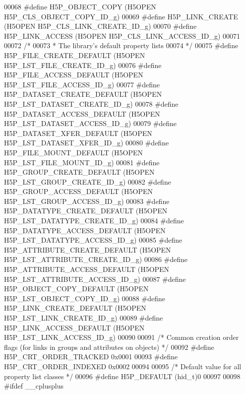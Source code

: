 \begin{DoxyCode}
00068 \textcolor{preprocessor}{#define H5P\_OBJECT\_COPY         (H5OPEN H5P\_CLS\_OBJECT\_COPY\_ID\_g)}
00069 \textcolor{preprocessor}{#define H5P\_LINK\_CREATE         (H5OPEN H5P\_CLS\_LINK\_CREATE\_ID\_g)}
00070 \textcolor{preprocessor}{#define H5P\_LINK\_ACCESS         (H5OPEN H5P\_CLS\_LINK\_ACCESS\_ID\_g)}
00071 
00072 \textcolor{comment}{/*}
00073 \textcolor{comment}{ * The library's default property lists}
00074 \textcolor{comment}{ */}
00075 \textcolor{preprocessor}{#define H5P\_FILE\_CREATE\_DEFAULT     (H5OPEN H5P\_LST\_FILE\_CREATE\_ID\_g)}
00076 \textcolor{preprocessor}{#define H5P\_FILE\_ACCESS\_DEFAULT     (H5OPEN H5P\_LST\_FILE\_ACCESS\_ID\_g)}
00077 \textcolor{preprocessor}{#define H5P\_DATASET\_CREATE\_DEFAULT      (H5OPEN H5P\_LST\_DATASET\_CREATE\_ID\_g)}
00078 \textcolor{preprocessor}{#define H5P\_DATASET\_ACCESS\_DEFAULT      (H5OPEN H5P\_LST\_DATASET\_ACCESS\_ID\_g)}
00079 \textcolor{preprocessor}{#define H5P\_DATASET\_XFER\_DEFAULT    (H5OPEN H5P\_LST\_DATASET\_XFER\_ID\_g)}
00080 \textcolor{preprocessor}{#define H5P\_FILE\_MOUNT\_DEFAULT          (H5OPEN H5P\_LST\_FILE\_MOUNT\_ID\_g)}
00081 \textcolor{preprocessor}{#define H5P\_GROUP\_CREATE\_DEFAULT    (H5OPEN H5P\_LST\_GROUP\_CREATE\_ID\_g)}
00082 \textcolor{preprocessor}{#define H5P\_GROUP\_ACCESS\_DEFAULT    (H5OPEN H5P\_LST\_GROUP\_ACCESS\_ID\_g)}
00083 \textcolor{preprocessor}{#define H5P\_DATATYPE\_CREATE\_DEFAULT (H5OPEN H5P\_LST\_DATATYPE\_CREATE\_ID\_g)}
00084 \textcolor{preprocessor}{#define H5P\_DATATYPE\_ACCESS\_DEFAULT     (H5OPEN H5P\_LST\_DATATYPE\_ACCESS\_ID\_g)}
00085 \textcolor{preprocessor}{#define H5P\_ATTRIBUTE\_CREATE\_DEFAULT    (H5OPEN H5P\_LST\_ATTRIBUTE\_CREATE\_ID\_g)}
00086 \textcolor{preprocessor}{#define H5P\_ATTRIBUTE\_ACCESS\_DEFAULT    (H5OPEN H5P\_LST\_ATTRIBUTE\_ACCESS\_ID\_g)}
00087 \textcolor{preprocessor}{#define H5P\_OBJECT\_COPY\_DEFAULT     (H5OPEN H5P\_LST\_OBJECT\_COPY\_ID\_g)}
00088 \textcolor{preprocessor}{#define H5P\_LINK\_CREATE\_DEFAULT     (H5OPEN H5P\_LST\_LINK\_CREATE\_ID\_g)}
00089 \textcolor{preprocessor}{#define H5P\_LINK\_ACCESS\_DEFAULT     (H5OPEN H5P\_LST\_LINK\_ACCESS\_ID\_g)}
00090 
00091 \textcolor{comment}{/* Common creation order flags (for links in groups and attributes on objects) */}
00092 \textcolor{preprocessor}{#define H5P\_CRT\_ORDER\_TRACKED           0x0001}
00093 \textcolor{preprocessor}{#define H5P\_CRT\_ORDER\_INDEXED           0x0002}
00094 
00095 \textcolor{comment}{/* Default value for all property list classes */}
00096 \textcolor{preprocessor}{#define H5P\_DEFAULT     (hid\_t)0}
00097 
00098 \textcolor{preprocessor}{#ifdef \_\_cplusplus}

\end{DoxyCode}
